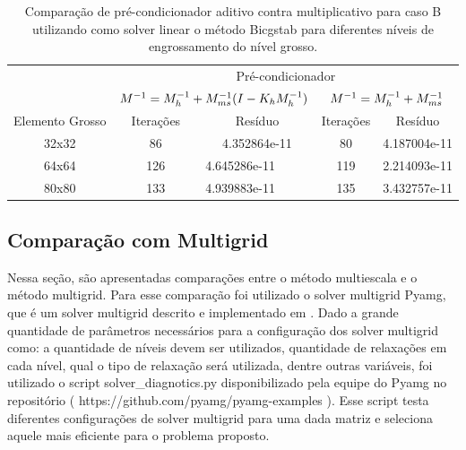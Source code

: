 \begin{table}[]
    \caption{Comparação de pré-condicionador aditivo contra multiplicativo para caso B utilizando como solver linear o método Bicgstab para diferentes níveis de engrossamento do nível grosso.}
    \label{table:precondcasoBcomp}
    \begin{tabular}{c|c|l|c|l|}
    \cline{2-5}
                                          & \multicolumn{4}{c|}{Pré-condicionador}                                                        \\ \cline{2-5} 
                                          & \multicolumn{2}{c|}{$M^{-1}=M^{-1}_{h} + M^{-1}_{ms}(I-K_hM^{-1}_{h})$}               & \multicolumn{2}{c|}{$M^{-1}=M^{-1}_{h} + M^{-1}_{ms}$}                \\ \hline
    \multicolumn{1}{|c|}{Elemento Grosso} & Iterações & \multicolumn{1}{c|}{Resíduo}      & Iterações & \multicolumn{1}{c|}{Resíduo}      \\ \hline
    \multicolumn{1}{|c|}{32x32}           & 86        & \multicolumn{1}{c|}{4.352864e-11} & 80        & \multicolumn{1}{c|}{4.187004e-11} \\ \hline
    \multicolumn{1}{|c|}{64x64}           & 126       & 4.645286e-11                      & 119       & 2.214093e-11                      \\ \hline
    \multicolumn{1}{|c|}{80x80}           & 133       & 4.939883e-11                      & 135       & 3.432757e-11                      \\ \hline
    \end{tabular}
\end{table}


\subsection{Comparação com Multigrid}

Nessa seção, são apresentadas comparações entre o método multiescala e o método multigrid. Para esse comparação foi utilizado o solver multigrid Pyamg, que é um solver multigrid  descrito e implementado em \cite{OlSc2018}. 
Dado a grande quantidade de parâmetros necessários para a configuração dos solver multigrid como: a quantidade de níveis devem ser utilizados, quantidade de relaxações em cada nível, qual o tipo de relaxação será utilizada, dentre outras variáveis, foi utilizado o script solver\_diagnotics.py disponibilizado pela equipe do Pyamg no repositório ( https://github.com/pyamg/pyamg-examples ). Esse script testa diferentes configurações de solver multigrid para uma dada matriz e seleciona aquele mais eficiente para o problema proposto.

